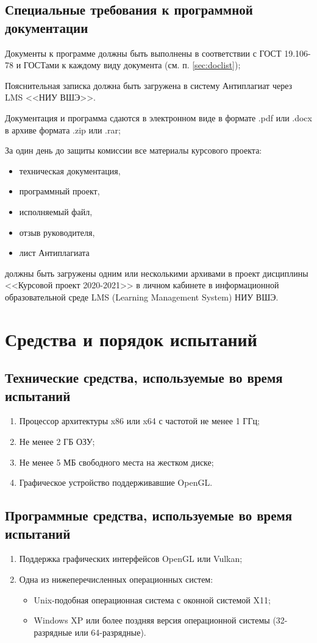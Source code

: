 \documentclass[a4paper,12pt]{article}
\begin{document}
  \subsection{Специальные требования к программной документации}
  Документы к программе должны быть выполнены в соответствии с ГОСТ 19.106-78 и ГОСТами к каждому виду документа
  (см. п. \ref{sec:doclist});

  Пояснительная записка должна быть загружена в систему Антиплагиат через LMS <<НИУ ВШЭ>>.

  Документация и программа сдаются в электронном виде в формате .pdf или .docx в архиве формата .zip или .rar;

  За один день до защиты комиссии все материалы курсового проекта:
  \begin{itemize}
    \item техническая документация,
    \item программный проект,
    \item исполняемый файл,
    \item отзыв руководителя,
    \item лист Антиплагиата
  \end{itemize}
  должны быть загружены одним или несколькими архивами в проект дисциплины <<Курсовой проект 2020-2021>> в личном кабинете в информационной образовательной среде LMS (Learning Management System) НИУ ВШЭ.

  \newpage
  \section{Средства и порядок испытаний}
  \subsection{Технические средства, используемые во время испытаний}
  \begin{enumerate}
    \item Процессор архитектуры x86 или x64 с частотой не менее 1 ГГц;
    \item Не менее 2 ГБ ОЗУ;
    \item Не менее 5 МБ свободного места на жестком диске;
    \item Графическое устройство поддерживавшие OpenGL.
  \end{enumerate}
  \subsection{Программные средства, используемые во время испытаний}
  \begin{enumerate}
    \item Поддержка графических интерфейсов OpenGL или Vulkan;
    \item Одна из нижеперечисленных операционных систем:
    \begin{itemize}
      \item Unix-подобная операционная система с оконной системой X11;
      \item Windows XP или более поздняя версия операционной системы (32-разрядные или 64-разрядные).
    \end{itemize}
  \end{enumerate}
\end{document}
